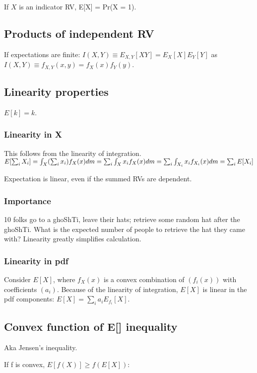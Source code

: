 \documentclass[oneside, article]{memoir}
\begin{document}
If $X$ is an indicator RV, E[X] = Pr(X = 1).

\subsection{Products of independent RV}
If expectations are finite: $I(X,Y) \equiv E_{X, Y}[XY]=E_{X}[X]E_Y[Y]$ as $I(X,Y) \equiv f_{X, Y}(x, y) = f_X(x)f_Y(y)$.

\subsection{Linearity properties}
$E[k]=k$.

\subsubsection{Linearity in X}
This follows from the linearity of integration.\\ $E[\sum_{i} X_{i}] = \int_{X} (\sum_{i} x_{i}) f_X(x) dm = \sum_{i} \int_{X} x_{i} f_X(x)dm\\ = \sum_{i} \int_{X_i} x_{i} f_{X_i}(x)dm = \sum_{i}E[X_{i}]$

Expectation is linear, even if the summed RVs are dependent.


\subsubsection{Importance}
 10 folks go to a ghoShTi, leave their hats; retrieve some random hat after the ghoShTi. What is the expected number of people to retrieve the hat they came with? Linearity greatly simplifies calculation.


\subsubsection{Linearity in pdf}
Consider $E[X]$, where $f_X(x)$ is a convex combination of $(f_i(x))$ with coefficients $(a_i)$. Because of the linearity of integration, $E[X]$ is linear in the pdf components: $E[X] = \sum_i a_i E_{f_i}[X]$.

\subsection{Convex function of E[] inequality}
Aka Jensen's inequality.

If f is convex, $E[f(X)] \geq f(E[X])$:  
\end{document}
